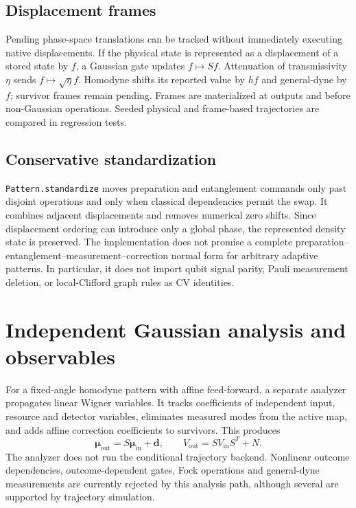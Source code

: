 \documentclass[a4paper,twocolumn,11pt,nopdfoutputerror]{quantumarticle}
\begin{document}
\subsection{Displacement frames}

Pending phase-space translations can be tracked without immediately executing
native displacements. If the physical state is represented as a displacement
of a stored state by $f$, a Gaussian gate updates $f\mapsto Sf$.
Attenuation of transmissivity $\eta$ sends $f\mapsto\sqrt\eta f$.
Homodyne shifts its reported value by $hf$ and general-dyne by $f$; survivor
frames remain pending. Frames are materialized at outputs and before
non-Gaussian operations. Seeded physical and frame-based trajectories are
compared in regression tests.

\subsection{Conservative standardization}

\texttt{Pattern.standardize} moves preparation and entanglement commands only
past disjoint operations and only when classical dependencies permit the swap.
It combines adjacent displacements and removes numerical zero shifts. Since
displacement ordering can introduce only a global phase, the represented
density state is preserved. The implementation does not promise a complete
preparation--entanglement--measurement--correction normal form for arbitrary
adaptive patterns. In particular, it does not import qubit signal parity,
Pauli measurement deletion, or local-Clifford graph rules as CV identities.

\section{Independent Gaussian analysis and observables}

For a fixed-angle homodyne pattern with affine feed-forward, a separate analyzer
propagates linear Wigner variables. It tracks coefficients of independent input,
resource and detector variables, eliminates measured modes from the active
map, and adds affine correction coefficients to survivors. This produces
\begin{equation}
 \bm\mu_{\mathrm{out}}=S\bm\mu_{\mathrm{in}}+\bm d,
 \qquad V_{\mathrm{out}}=SV_{\mathrm{in}}S^T+N.
 \label{eq:channel}
\end{equation}
The analyzer does not run the conditional trajectory backend. Nonlinear
outcome dependencies, outcome-dependent gates, Fock operations and general-dyne
measurements are currently rejected by this analysis path, although several
are supported by trajectory simulation.
\end{document}

